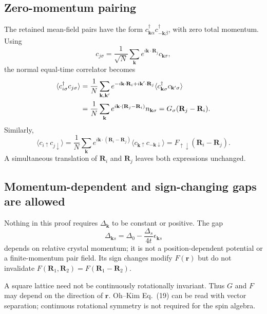 \documentclass[11pt]{article}
\begin{document}
\subsection{Zero-momentum pairing}

The retained mean-field pairs have the form $c_{\mathbf k\alpha}^{\dagger}c_{-\mathbf k\beta}^{\dagger}$, with zero total momentum. Using
\begin{equation}
c_{j\sigma}=\frac1{\sqrt N}\sum_{\mathbf k}e^{i\mathbf k\cdot\mathbf R_j}c_{\mathbf k\sigma},
\end{equation}
the normal equal-time correlator becomes
\begin{align}
\langle c_{i\sigma}^{\dagger}c_{j\sigma}\rangle
&=\frac1N\sum_{\mathbf k,\mathbf k'}e^{-i\mathbf k\cdot\mathbf R_i+i\mathbf k'\cdot\mathbf R_j}
\langle c_{\mathbf k\sigma}^{\dagger}c_{\mathbf k'\sigma}\rangle\notag\\
&=\frac1N\sum_{\mathbf k}e^{i\mathbf k\cdot(\mathbf R_j-\mathbf R_i)}n_{\mathbf k\sigma}
=G_\sigma(\mathbf R_j-\mathbf R_i).
\end{align}
Similarly,
\begin{equation}
\langle c_{i\uparrow}c_{j\downarrow}\rangle
=\frac1N\sum_{\mathbf k}e^{i\mathbf k\cdot(\mathbf R_i-\mathbf R_j)}
\langle c_{\mathbf k\uparrow}c_{-\mathbf k\downarrow}\rangle
=F_{\uparrow\downarrow}(\mathbf R_i-\mathbf R_j).
\end{equation}
A simultaneous translation of $\mathbf R_i$ and $\mathbf R_j$ leaves both expressions unchanged.

\subsection{Momentum-dependent and sign-changing gaps are allowed}

Nothing in this proof requires $\Delta_{\mathbf k}$ to be constant or positive. The gap
\begin{equation}
\Delta_{\mathbf ks}=\Delta_0-\frac{\Delta_s}{4t}\epsilon_{\mathbf ks}
\end{equation}
depends on relative crystal momentum; it is not a position-dependent potential or a finite-momentum pair field. Its sign changes modify $F(\mathbf r)$ but do not invalidate $F(\mathbf R_1,\mathbf R_2)=F(\mathbf R_1-\mathbf R_2)$.

A square lattice need not be continuously rotationally invariant. Thus $G$ and $F$ may depend on the direction of $\mathbf r$. Oh--Kim Eq.~(19) can be read with vector separation; continuous rotational symmetry is not required for the spin algebra.
\end{document}
